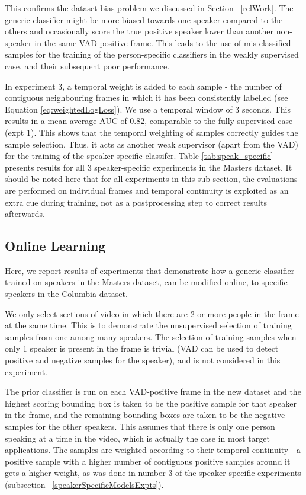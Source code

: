 \documentclass[runningheads]{llncs}
\begin{document}
This confirms the dataset bias problem we discussed in Section ~\ref{relWork}. The generic classifier might be more biased towards one speaker compared to the others and occasionally score the true positive speaker lower than another non-speaker in the same VAD-positive frame. This leads to the use of mis-classified samples for the training of the person-specific classifiers in the weakly supervised case, and their subsequent poor performance.

In experiment 3, a temporal weight is added to each sample - the number of contiguous neighbouring frames in which it has been consistently labelled  (see Equation \ref{eq:weightedLogLoss}). We use a temporal window of 3 seconds. This results in a mean average AUC of 0.82, comparable to the fully supervised case (expt 1). This shows that the temporal weighting of samples correctly guides the sample selection. Thus, it acts as another weak supervisor (apart from the VAD) for the training of the speaker specific classifer. Table \ref{tab:speak_specific} presents results for all 3 speaker-specific  experiments in the Masters dataset.
It should be noted here that for all experiments in this sub-section, the evaluations are performed on individual frames and temporal continuity is exploited as an extra cue during training, not as a postprocessing step to correct results afterwards. 



\subsection{Online Learning}
Here, we report results of experiments that demonstrate how a generic classifier trained on speakers in the Masters dataset, can be modified online, to specific speakers in the Columbia dataset.

We only select sections of video in which there are 2 or more people in the frame at the same time. This is to demonstrate the unsupervised selection of training samples from one among many speakers. The selection of training samples when only 1 speaker is present in the frame is trivial (VAD can be used to detect positive and negative samples for the speaker), and is not considered in this experiment.

The prior classifier is run on each VAD-positive frame in the new dataset and the highest scoring bounding box is taken to be the positive sample for that speaker in the frame, and the remaining bounding boxes are taken to be the negative samples for the other speakers. This assumes that there is only one person speaking at a time in the video, which is actually the case in most target applications. The samples are weighted according to their temporal continuity - a positive sample with a higher number of contiguous positive samples around it gets a higher weight, as was done in number 3 of the speaker specific experiments (subsection ~\ref{speakerSpecificModelsExpts}). 
\end{document}
